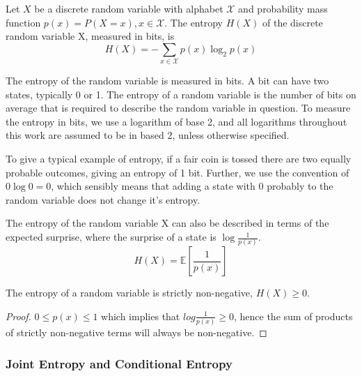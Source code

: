 \begin{definition}
	Let $X$ be a discrete random variable with alphabet $\mathcal{X}$ and probability mass function $p(x) = P(X = x), x \in \mathcal{X}$.
	The entropy $H(X)$ of the discrete random variable X, measured in bits, is 
	\begin{equation}\label{eq:shannon}
	H(X)=-\sum_{x \in \mathcal{X}} p(x) \log_2 p(x)
	\end{equation}
\end{definition} 

The entropy of the random variable is measured in bits. A bit can have two states, typically 0 or 1. The entropy of a random variable is the number of bits on average that is required to describe the random variable in question. To measure the entropy in bits, we use a logarithm of base 2, and all logarithms throughout this work are assumed to be in based 2, unless otherwise specified.

To give a typical example of entropy, if a fair coin is tossed there are two equally probable outcomes, giving an entropy of 1 bit. Further, we use the convention of $0\log 0 = 0$, which sensibly means that adding a state with 0 probably to the random variable does not change it's entropy.

\begin{remark}[Suprise]
	The entropy of the random variable X can also be described in terms of the expected surprise, where the surprise of a state is $\log \frac{1}{p(x)}$.
	\begin{equation}
		H(X) = \mathbb{E} \left[ \frac{1}{p(x)} \right]
	\end{equation}
\end{remark}	





\begin{lemma}
	The entropy of a random variable is strictly non-negative, $H(X) \geq 0$.
\end{lemma}

\begin{proof}
	$0 \leq p(x) \leq 1$ which implies that $log \frac{1}{p(x)} \geq 0$,
	hence the sum of products of strictly non-negative terms will always be non-negative. 
\end{proof}


\subsubsection{Joint Entropy and Conditional Entropy}

